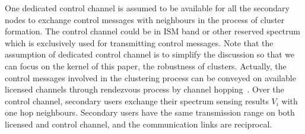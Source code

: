 \documentclass[journal,comsoc]{IEEEtran}
\theoremstyle{mytheoremstyle}
\theoremstyle{mytheoremstyle}
\theoremstyle{mytheoremstyle}
\begin{document}
One dedicated control channel is assumed to be available for all the secondary nodes to exchange control messages with neighbours in the process of cluster formation.
The control channel could be in ISM band or other reserved spectrum which is exclusively used for transmitting control messages.
Note that the assumption of dedicated control channel is to simplify the discussion so that we can focus on the kernel of this paper, the robustness of clusters.
Actually, the control messages involved in the clustering process can be conveyed on available licensed channels through rendezvous process by channel hopping~\cite{channelHopping_Rendezvous_2014, Gu_distributed_rendezvous_2014}. 
Over the control channel, secondary users exchange their spectrum sensing results $V_{i}$ with one hop neighbours. 
Secondary users have the same transmission range on both licensed and control channel, and the communication links are reciprocal.



\end{document}
